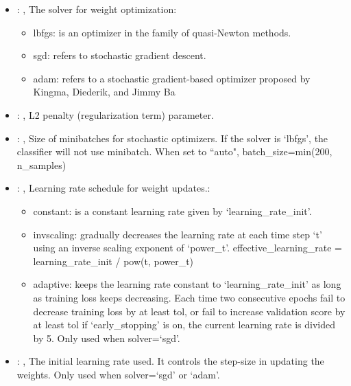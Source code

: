\begin{itemize}
    \item {}: , 
      The solver for weight optimization:
      \begin{itemize}                                                    \item lbfgs: is an
      optimizer in the family of quasi-Newton methods.
      \item sgd: refers to stochastic gradient descent.
      \item adam: refers to a stochastic gradient-based optimizer proposed by Kingma, Diederik, and
      Jimmy Ba                                                  \end{itemize}

    \item {}: , 
      L2 penalty (regularization term) parameter.

    \item {}: , 
      Size of minibatches for stochastic optimizers. If the solver is `lbfgs',
      the classifier will not use minibatch. When set to ``auto", batch\_size=min(200, n\_samples)

    \item {}: , 
      Learning rate schedule for weight updates.:
      \begin{itemize}                                                   \item constant: is a
      constant learning rate given by `learning\_rate\_init'.
      \item invscaling: gradually decreases the learning rate at each time step `t' using
      an inverse scaling exponent of `power\_t'. effective\_learning\_rate = learning\_rate\_init /
      pow(t, power\_t)                                                   \item adaptive: keeps the
      learning rate constant to `learning\_rate\_init' as long as training
      loss keeps decreasing. Each time two consecutive epochs fail to decrease training loss by at
      least tol, or fail to increase validation score by at least tol if `early\_stopping' is on,
      the current learning rate is divided by 5. Only used when solver=`sgd'.
      \end{itemize}

    \item {}: , 
      The initial learning rate used. It controls the step-size in updating the weights.
      Only used when solver=`sgd' or `adam'.


\end{itemize}
